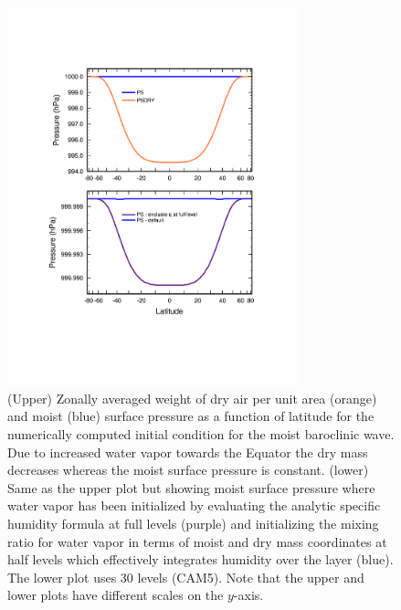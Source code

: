\documentclass{agujournal}
\begin{document}
{\begin{figure}[h]
\centering
\includegraphics[width=20pc]{figs/01_baro_init.pdf}
\caption{(Upper) Zonally averaged weight of dry air per unit area (orange) and moist (blue) surface pressure as a function of latitude for the numerically computed initial condition for the moist baroclinic wave. Due to increased water vapor towards the Equator the dry mass decreases whereas the moist surface pressure is constant. (lower) Same as the upper plot but showing moist surface pressure where water vapor has been initialized by evaluating the analytic specific humidity formula at full levels (purple) and initializing the mixing ratio for water vapor in terms of moist and dry mass coordinates at half levels which effectively integrates humidity over the layer (blue). The lower plot uses 30 levels (CAM5). Note that the upper and lower plots have different scales on the $y$-axis.}
\label{fig:baro_init}
\end{figure}

}
\end{document}
